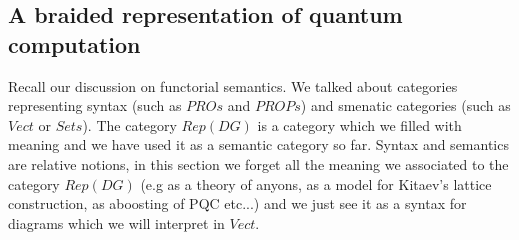 \documentclass{article}
\begin{document}
\subsection{A braided representation of quantum computation}
Recall our discussion on functorial semantics. We talked about categories representing syntax (such as $PROs$ and $PROPs$) and smenatic categories (such as $Vect$ or $Sets$). The category $Rep(DG)$ is a category which we filled with meaning and we have used it as a semantic category so far. Syntax and semantics are relative notions, in this section we forget all the meaning we associated to the category $Rep(DG)$ (e.g as a theory of anyons, as a model for Kitaev's lattice construction, as aboosting of PQC etc...) and we just see it as a syntax for diagrams which we will interpret in $Vect$.\\
\end{document}
